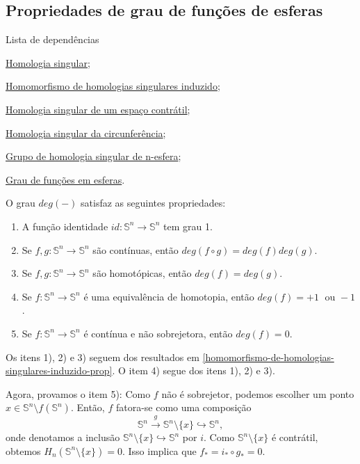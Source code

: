 \subsection{Propriedades de grau de funções de esferas} %
\label{propriedades-de-grau-de-funções-prop}
\begin{titlemize}{Lista de dependências}
    \item \hyperref[homologia-singular-def]{Homologia singular};\\
    \item \hyperref[homomorfismo-de-homologias-singulares-induzido-prop]{Homomorfismo de homologias singulares induzido};\\
    \item \hyperref[homologia-singular-de-um-espaco-contratil-prop]{Homologia singular de um espaço contrátil};\\
    \item \hyperref[homologia-singular-de-S1-prop]{Homologia singular da circunferência};\\
    \item \hyperref[grupo-de-homologia-singular-de-n-esfera-prop]{Grupo de homologia singular de n-esfera};\\
    \item \hyperref[grau-de-funcoes-em-esferas-def]{Grau de funções em esferas}.
\end{titlemize}

\begin{prop}
    O grau $deg(-)$ satisfaz as seguintes propriedades:
    \begin{enumerate}
        \item A função identidade $id:\mathbb{S}^n\rightarrow \mathbb{S}^n$ tem grau 1.
        \item Se $f,g:\mathbb{S}^n\rightarrow\mathbb{S}^n$ são contínuas, então $deg(f\circ g)=deg(f)deg(g)$.
        \item Se $f,g:\mathbb{S}^n\rightarrow\mathbb{S}^n$ são homotópicas, então $deg(f)=deg(g)$.
        \item Se $f:\mathbb{S}^n\rightarrow\mathbb{S}^n$ é uma equivalência de homotopia, então $deg(f)=+1\;\text{ ou }-1$.
        \item Se $f:\mathbb{S}^n\rightarrow\mathbb{S}^n$ é contínua e não sobrejetora, então $deg(f)=0$.
    \end{enumerate}
\end{prop}

\begin{dem}
    Os itens 1), 2) e 3) seguem dos resultados em \ref{homomorfismo-de-homologias-singulares-induzido-prop}. O item 4) segue dos itens 1), 2) e 3). 

    Agora, provamos o item 5): Como $f$ não é sobrejetor, podemos escolher um ponto $x\in \mathbb{S}^n\setminus f(\mathbb{S}^n)$. Então, $f$ fatora-se como uma composição \[\mathbb{S}^n\xrightarrow{g} \mathbb{S}^n\setminus\{x\}\hookrightarrow \mathbb{S}^n,\]
    onde denotamos a inclusão $\mathbb{S}^n\setminus\{x\}\hookrightarrow \mathbb{S}^n$ por $i$.
    Como $\mathbb{S}^n\setminus\{x\}$ é contrátil, obtemos $H_n(\mathbb{S}^n\setminus \{x\})=0$. Isso implica que $f_*=i_*\circ g_*=0$.
\end{dem}

